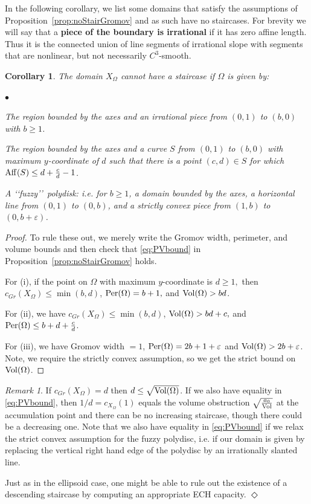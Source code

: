 \documentclass[11pt, reqno]{amsart}
\newtheorem{cor}[thm]{Corollary}
\theoremstyle{remark}
\numberwithin{equation}{subsection}
\numberwithin{figure}{section}
\theoremstyle{customremark}
\newtheorem{rmk_no_diamond}[thm]{Remark}
\newenvironment{rmk}{\begin{rmk_no_diamond} } {\hfill$\er$ \end{rmk_no_diamond}}
\newcommand{\Vol}{{\rm Vol}}
\newcommand{\Per}{{\rm Per}}
\newenvironment{itemlist}
   { \begin{list} {$\bullet$}
         { \setlength{\topsep}{.5ex}  \setlength{\itemsep}{.5ex} \setlength{\leftmargin}{2.5ex} } }
   { \end{list} }
\newcommand{\Aff}{{\rm Aff}}
\newcommand{\Om}{{\Omega}}
\newcommand{\er}{{\Diamond}}
\newcommand{\eps}{\varepsilon}
\begin{document}
In the following corollary, we list some domains that satisfy the assumptions of Proposition~\ref{prop:noStairGromov} and as such have no staircases. For brevity we will say that a {\bf piece of the boundary is irrational} if it has zero affine length. Thus it is the connected union of  line segments of irrational slope with segments that are nonlinear, but not necessarily $C^3$-smooth.


\begin{cor} The  domain $X_\Omega$ cannot have a staircase if $\Omega$ is given by: 
\begin{itemlist}
    \item[{\rm (i)}]  The region bounded by the axes and an irrational piece from $(0,1)$ to $(b,0)$ with $b \geq 1$.
    \item[{\rm (ii)}] The region bounded by the axes and a curve  $S$ from $(0,1)$ to $(b,0)$ with maximum $y$-coordinate of $d$ such that there is a point $(c,d)\in S$ %
    for which  $\Aff(S)\leq d +\frac{c}{d} - 1$.
    \item[{\rm (iii)}] A \lq\lq fuzzy\rq\rq\, polydisk: i.e. for $b \geq 1$, a domain bounded by the axes, a horizontal line from $(0,1)$ to $(0,b)$, and a strictly convex piece  from $(1,b)$ to $(0,b+\eps)$. 
\end{itemlist}
\end{cor}

\begin{proof}
To rule these out, we merely write the Gromov width, perimeter, and volume bounds and then  check that \eqref{eq:PVbound} in Proposition~\ref{prop:noStairGromov} holds. 

    For (i), if the point on $\Omega$ with maximum $y$-coordinate is $d \geq 1,$ then $c_{Gr}(X_\Omega) \leq \min(b,d)$, $\Per(\Omega)=b+1,$ and $\Vol(\Omega)>bd$. 

    For (ii), we have $c_{Gr}(X_\Omega) \leq \min(b,d)$,  $\Vol(\Omega)>bd+c,$ and $\Per(\Om)\leq b+d +\frac{c}{d}$.

    
    For (iii), we have Gromov width $=1$, $\Per(\Omega)=2b+1+\eps$ and $\Vol(\Omega)>2b+\eps$. Note, we require the strictly convex assumption, so we get the strict bound on $\Vol(\Omega)$. 
\end{proof}


\begin{rmk}
If $c_{Gr}(X_{\Omega})=d$ then $ d \le \sqrt{\Vol(\Om)}$.  If we also  have  equality in \eqref{eq:PVbound},  then $1/d = c_{X_\Om}(1)$ equals the 
volume obstruction $\sqrt{\frac{a_0}{\Vol}}$ at  the accumulation point and there can be no
increasing staircase, though there could be a decreasing one. 
Note that we also have equality in \eqref{eq:PVbound} if we relax the strict convex assumption for the fuzzy polydisc, i.e. if our domain is given by replacing the vertical right hand edge of the polydisc by an irrationally slanted line. 

   Just as in the ellipsoid case, one might be able to rule  out the existence of a  descending staircase by computing an appropriate ECH capacity. 
  \end{rmk}
\end{document}
